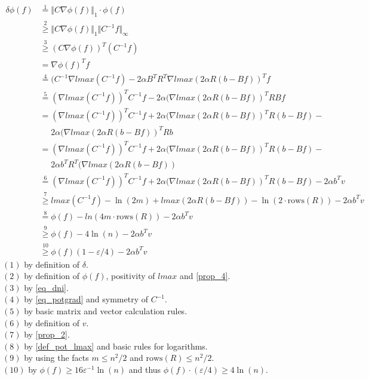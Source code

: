 \begin{align*}
\delta\phi(f)&\stackrel{1}{=}\Vert C\nabla\phi(f)\Vert_1\cdot \phi(f)\\
&\stackrel{2}{\geq} \Vert C\nabla\phi(f)\Vert_1\Vert C^{-1}f\Vert_\infty\\
&\stackrel{3}{\geq} (C\nabla \phi(f))^T(C^{-1}f)\\
&=\nabla\phi(f)^T f\\
&\stackrel{4}{=}(C^{-1}\nabla lmax(C^{-1}f)-2\alpha B^TR^T\nabla lmax(2\alpha R(b-Bf))^Tf\\
&\stackrel{5}{=}(\nabla lmax(C^{-1}f))^TC^{-1}f-2\alpha(\nabla lmax(2\alpha R(b-Bf))^TRBf\\
&=(\nabla lmax(C^{-1}f))^TC^{-1}f+2\alpha(\nabla lmax(2\alpha R(b-Bf))^TR(b-Bf)-\\
&~~~~~~2\alpha(\nabla lmax(2\alpha R(b-Bf))^TRb\\
&=(\nabla lmax(C^{-1}f))^TC^{-1}f+2\alpha(\nabla lmax(2\alpha R(b-Bf))^TR(b-Bf)-\\
&~~~~~~2\alpha b^TR^T(\nabla lmax(2\alpha R(b-Bf))\\
&\stackrel{6}{=}(\nabla lmax(C^{-1}f))^TC^{-1}f+2\alpha(\nabla lmax(2\alpha R(b-Bf))^TR(b-Bf)-2\alpha b^T v\\
&\stackrel{7}{\geq}lmax(C^{-1}f)-\ln(2m)+lmax(2\alpha R(b-Bf))-\ln(2\cdot \text{rows}(R))-2\alpha b^T v\\
&\stackrel{8}{=}\phi(f)-ln(4m\cdot\text{rows}(R))-2\alpha b^T v\\
&\stackrel{9}{\geq}\phi(f)-4\ln(n)-2\alpha b^T v\\
&\stackrel{10}{\geq} \phi(f)(1-\varepsilon/4)-2\alpha b^T v
\end{align*}
$(1)$ by definition of $\delta$. \\
$(2)$ by definition of $\phi(f)$, positivity of $lmax$ and \ref{prop_4}. \\
$(3)$ by \ref{eq_dni}. \\
$(4)$ by \ref{eq_potgrad} and symmetry of $C^{-1}$.\\
$(5)$ by basic matrix and vector calculation rules.\\
$(6)$ by definition of $v$.\\
$(7)$ by \ref{prop_2}.\\
$(8)$ by \ref{def_pot_lmax} and basic rules for logarithms.\\
$(9)$ by using the facts $m\leq n^2/2$ and $\text{rows}(R)\leq n^2/2$.\\
$(10)$ by $\phi(f)\geq 16\varepsilon^{-1}\ln(n)$ and thus $\phi(f)\cdot(\varepsilon/4)\geq 4\ln(n)$.\\
